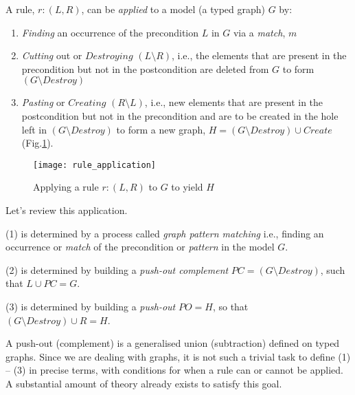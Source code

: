 A rule, $r: (L,R)$, can be \emph{applied} to a model (a typed graph) $G$ by:
\begin{enumerate}
  \item \emph{Finding} an occurrence of the precondition $L$ in $G$ via a \emph{match}, $m$
  
  \item \emph{Cutting} out or $Destroying$ $(L\setminus R)$, i.e., the elements that are present in the precondition but not in the postcondition are deleted
  from $G$ to form  $(G\setminus Destroy)$
  
  \item \emph{Pasting} or $Creating$ $(R\setminus L)$, i.e., new elements that are present in the postcondition but not in the precondition and are to be created
  in the hole left in $(G\setminus Destroy)$ to form a new graph, $H = (G\setminus Destroy) \cup Create$ (Fig.\ref{fig:rule_application}). 
  
  \end{enumerate}

\vspace{0.5cm}

\begin{figure}[htp]
\begin{center}
  \texttt{[image: rule\_application]}
  \caption[]{Applying a rule $r: (L,R)$ to $G$ to yield $H$} 
  \label{fig:rule_application}
\end{center}
\end{figure}

\vspace{0.5cm}

Let's review this application. 

(1) is determined by a process called \emph{graph pattern matching} i.e., finding an occurrence or
\emph{match} of the precondition or \emph{pattern} in the model $G$.

(2) is determined by building a \emph{push-out complement} $PC = (G\setminus Destroy)$, such that $L\cup PC = G$.

(3) is determined by building a \emph{push-out} $PO = H$, so that $(G\setminus Destroy) \cup R = H$.

A push-out (complement) is a generalised union (subtraction) defined on typed graphs. Since we are dealing with graphs, it is not such a trivial task to define
(1) -- (3) in precise terms, with conditions for when a rule can or cannot be applied. A substantial amount of theory already exists to satisfy this goal.


